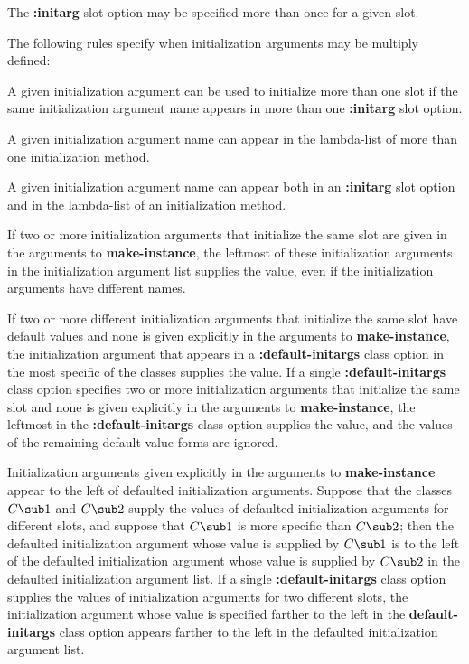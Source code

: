 \endsubSection%


The {\bf :initarg} slot option may be specified more than
once for a given slot.

The following rules specify when initialization arguments may be
multiply defined:

\beginlist

\item{\bull} A given initialization argument can be used to
initialize more than one slot if the same initialization argument name
appears in more than one {\bf :initarg} slot option.

\item{\bull} A given initialization argument name can appear 
in the lambda-list of more than one initialization method.

\item{\bull} A given initialization argument name can
appear both in an {\bf :initarg} slot option and in the lambda-list
of an initialization method.

\endlist

If two or more initialization arguments that initialize
the same slot are given in the arguments to {\bf make-instance}, the
leftmost of these initialization arguments in the initialization
argument list supplies the value, even if the initialization arguments
have different names.

If two or more different initialization arguments that
initialize the same slot have default values and none is given
explicitly in the arguments to {\bf make-instance}, the initialization
argument that appears in a {\bf :default-initargs} class option in the
most specific of the classes supplies the value. If a single {\bf
:default-initargs} class option specifies two or more initialization
arguments that initialize the same slot and none is given explicitly
in the arguments to {\bf make-instance}, the leftmost in the {\bf
:default-initargs} class option supplies the value, and the values of
the remaining default value forms are ignored.

Initialization arguments given explicitly in the
arguments to {\bf make-instance} appear to the left of defaulted
initialization arguments. Suppose that the classes $C\sub 1$ and
$C\sub 2$ supply the values of defaulted initialization arguments for
different slots, and suppose that $C\sub 1$ is more specific than
$C\sub 2$; then the defaulted initialization argument whose value is
supplied by $C\sub 1$ is to the left of the defaulted initialization
argument whose value is supplied by $C\sub 2$ in the defaulted
initialization argument list.  If a single {\bf :default-initargs}
class option supplies the values of initialization arguments for two
different slots, the initialization argument whose value is specified
farther to the left in the {\bf default-initargs} class option appears
farther to the left in the defaulted initialization argument list.

